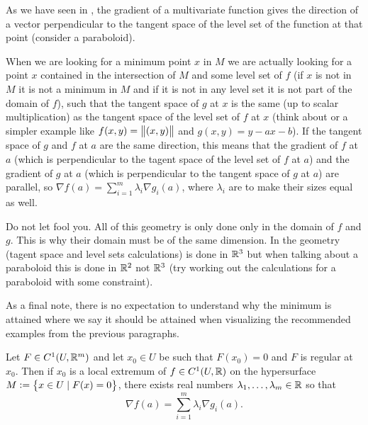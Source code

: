 \documentclass[11pt,a4paper]{article}
\begin{document}
\begin{remark}
  As we have seen in ,
  the gradient of a multivariate function gives the direction
  of a vector perpendicular to the tangent space of the
  level set of the function at that point (consider a paraboloid).

  When we are looking for a minimum point $x$ in $M$ we are actually looking
  for a point $x$ contained in the intersection of $M$ and some
  level set of $f$ (if $x$ is not in $M$ it is not a minimum in $M$
  and if it is not in any level set it is not part of the domain of $f$),
  such that the tangent space of $g$ at $x$ is the same
  (up to scalar multiplication) as the tangent space of the level set
  of $f$ at $x$ (think about 
  or a simpler example like $f(x,y) = \left\lVert(x,y)\right\rVert$ and $g(x,y) = y - ax - b$).
  If the tangent space of $g$ and $f$ at $a$ are the same direction,
  this means that the gradient of $f$ at $a$ (which is perpendicular
  to the tagent space of the level set of $f$ at $a$)
  and the gradient of $g$ at $a$ (which is perpendicular to the
  tangent space of $g$ at $a$) are parallel,
  so $\nabla f(a) = \sum_{i = 1}^{m}{\lambda_i \nabla g_i(a)}$,
  where $\lambda_i$ are to make their sizes equal as well.

  Do not let  fool you.
  All of this geometry is only done only in the domain of $f$ and $g$.
  This is why their domain must be of the same dimension.
  In  the geometry (tagent space and level sets 
  calculations) is done in $\mathbb{R}^3$ but when talking about a
  paraboloid this is done in $\mathbb{R}^2$ not $\mathbb{R}^3$
  (try working out the calculations for a paraboloid with some constraint).

  As a final note,
  there is no expectation to understand why the minimum is attained
  where we say it should be attained when visualizing the recommended
  examples from the previous paragraphs.
\end{remark}

\begin{proposition}
  Let $F \in C^1(U,\mathbb{R}^m)$ and let $x_0 \in U$ be such that $F(x_0) = 0$
  and $F$ is regular at $x_0$.
  Then if $x_0$ is a local extremum of $f \in C^1(U,\mathbb{R})$ on the hypersurface
  $M := \left\{x \in U \mid F(x) = 0\right\}$,
  there exists real numbers $\lambda_1,\dots,\lambda_m \in \mathbb{R}$ so that
  \[
    \nabla f(a) = \sum_{i = 1}^{m}{\lambda_i \nabla g_i(a)}.
  \]
\end{proposition}
\end{document}
